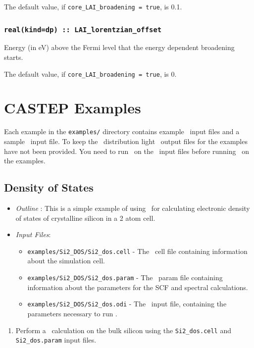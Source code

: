 \documentclass[a4paper,11pt,twoside]{book}
\begin{document}
{The default value, if \verb#core_LAI_broadening = true#, is 0.1. 

\subsection[core\_lorentzian\_offset]{\tt real(kind=dp) :: LAI\_lorentzian\_offset}
Energy (in eV) above the Fermi level that the energy dependent broadening starts.  

The default value, if \verb#core_LAI_broadening = true#, is 0.


\chapter{CASTEP Examples}

Each example in the \verb#examples/# directory contains example \castep\ input files and a sample \optados\ input file. To keep the \optados\ distribution light \castep\ output files for the examples have not been provided. You need to run \castep\ on the \castep\ input files before running \optados\ on the examples.

\section{Density of States}
\begin{itemize}
\item \emph{Outline} : This is a simple example of using \optados\ for calculating electronic density of states of crystalline silicon in a 2 atom cell.
\item \emph{Input Files}:
\begin{itemize}
\item \verb#examples/Si2_DOS/Si2_dos.cell# - The \castep\ cell file containing information about the simulation cell.
\item \verb#examples/Si2_DOS/Si2_dos.param# - The \castep\ param file containing information about the parameters for the SCF and spectral calculations.
\item \verb#examples/Si2_DOS/Si2_dos.odi# - The \optados\ input file, containing the parameters necessary to run \optados.
\end{itemize}
\end{itemize}

\begin{enumerate}
\item Perform a \castep\ calculation on the bulk silicon using the  \verb#Si2_dos.cell#  and \verb#Si2_dos.param# input files. 


\end{enumerate}}
\end{document}
